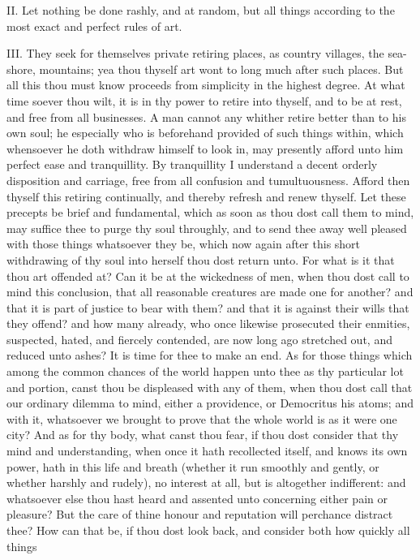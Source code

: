 II. Let nothing be done rashly, and at random, but all things according
to the most exact and perfect rules of art.

III. They seek for themselves private retiring
places, as country villages, the sea-shore, mountains; yea thou thyself
art wont to long much after such places. But all this thou must know
proceeds from simplicity in the highest degree. At what time soever thou
wilt, it is in thy power to retire into thyself, and to be at rest, and
free from all businesses. A man cannot any whither retire better than to
his own soul; he especially who is beforehand provided of such things
within, which whensoever he doth withdraw himself to look in, may
presently afford unto him perfect ease and tranquillity. By tranquillity I
understand a decent orderly disposition and carriage, free from all
confusion and tumultuousness. Afford then thyself this retiring
continually, and thereby refresh and renew thyself. Let these precepts be
brief and fundamental, which as soon as thou dost call them to mind, may
suffice thee to purge thy soul throughly, and to send thee away well
pleased with those things whatsoever they be, which now again after this
short withdrawing of thy soul into herself thou dost return unto. For what
is it that thou art offended at? Can it be at the wickedness of men, when
thou dost call to mind this conclusion, that all reasonable creatures are
made one for another? and that it is part of justice to bear with them?
and that it is against their wills that they offend? and how many already,
who once likewise prosecuted their enmities, suspected, hated, and
fiercely contended, are now long ago stretched out, and reduced unto
ashes? It is time for thee to make an end. As for those things which among
the common chances of the world happen unto thee as thy particular lot and
portion, canst thou be displeased with any of them, when thou dost call
that our ordinary dilemma to mind, either a providence, or Democritus his
atoms; and with it, whatsoever we brought to prove that the whole world is
as it were one city? And as for thy body, what canst thou fear, if thou
dost consider that thy mind and understanding, when once it hath
recollected itself, and knows its own power, hath in this life and breath
(whether it run smoothly and gently, or whether harshly and rudely), no
interest at all, but is altogether indifferent: and whatsoever else thou
hast heard and assented unto concerning either pain or pleasure? But the
care of thine honour and reputation will perchance distract thee? How can
that be, if thou dost look back, and consider both how quickly all things
